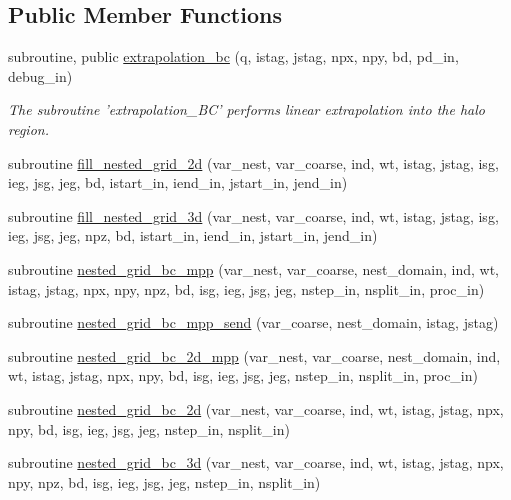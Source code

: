 \subsection*{Public Member Functions}
\begin{DoxyCompactItemize}
\item 
subroutine, public \hyperlink{classboundary__mod_a9e64851c792558a242d294f2546cdecf}{extrapolation\-\_\-bc} (q, istag, jstag, npx, npy, bd, pd\-\_\-in, debug\-\_\-in)
\begin{DoxyCompactList}\small\item\em The subroutine 'extrapolation\-\_\-\-B\-C' performs linear extrapolation into the halo region. \end{DoxyCompactList}\item 
subroutine \hyperlink{classboundary__mod_a8e20eda5ebe793a8c1bb882a9f45613e}{fill\-\_\-nested\-\_\-grid\-\_\-2d} (var\-\_\-nest, var\-\_\-coarse, ind, wt, istag, jstag, isg, ieg, jsg, jeg, bd, istart\-\_\-in, iend\-\_\-in, jstart\-\_\-in, jend\-\_\-in)
\item 
subroutine \hyperlink{classboundary__mod_a8aac4e694ce94fadb9a01b3bdcf41eeb}{fill\-\_\-nested\-\_\-grid\-\_\-3d} (var\-\_\-nest, var\-\_\-coarse, ind, wt, istag, jstag, isg, ieg, jsg, jeg, npz, bd, istart\-\_\-in, iend\-\_\-in, jstart\-\_\-in, jend\-\_\-in)
\item 
subroutine \hyperlink{classboundary__mod_a904cc618adbcbc7d960b0a94d816f703}{nested\-\_\-grid\-\_\-bc\-\_\-mpp} (var\-\_\-nest, var\-\_\-coarse, nest\-\_\-domain, ind, wt, istag, jstag, npx, npy, npz, bd, isg, ieg, jsg, jeg, nstep\-\_\-in, nsplit\-\_\-in, proc\-\_\-in)
\item 
subroutine \hyperlink{classboundary__mod_a15371881169edf409397b4d679d10aa4}{nested\-\_\-grid\-\_\-bc\-\_\-mpp\-\_\-send} (var\-\_\-coarse, nest\-\_\-domain, istag, jstag)
\item 
subroutine \hyperlink{classboundary__mod_a2ffb761cac6dd4a66d80975f3420d2ac}{nested\-\_\-grid\-\_\-bc\-\_\-2d\-\_\-mpp} (var\-\_\-nest, var\-\_\-coarse, nest\-\_\-domain, ind, wt, istag, jstag, npx, npy, bd, isg, ieg, jsg, jeg, nstep\-\_\-in, nsplit\-\_\-in, proc\-\_\-in)
\item 
subroutine \hyperlink{classboundary__mod_a4842213fca09ea613c2883dbf5fd9539}{nested\-\_\-grid\-\_\-bc\-\_\-2d} (var\-\_\-nest, var\-\_\-coarse, ind, wt, istag, jstag, npx, npy, bd, isg, ieg, jsg, jeg, nstep\-\_\-in, nsplit\-\_\-in)
\item 
subroutine \hyperlink{classboundary__mod_aa0305908bf38fd1dd2e740b7ed3d3809}{nested\-\_\-grid\-\_\-bc\-\_\-3d} (var\-\_\-nest, var\-\_\-coarse, ind, wt, istag, jstag, npx, npy, npz, bd, isg, ieg, jsg, jeg, nstep\-\_\-in, nsplit\-\_\-in)

\end{DoxyCompactItemize}
